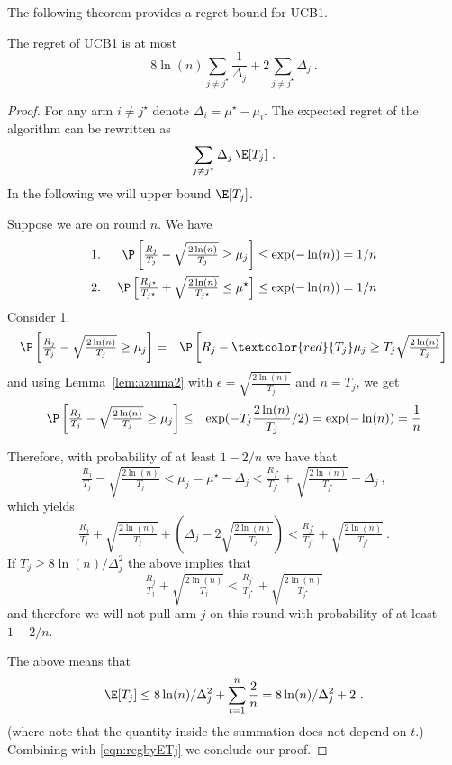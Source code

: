 The following theorem provides a regret bound for UCB1.
\begin{theorem}
The regret of UCB1 is at most
\[
8 \ln(n) \sum_{j \neq j^\star} \frac{1}{\Delta_j} + 2 \sum_{j \neq
  j^\star} \Delta_j ~.
\]
\end{theorem}
\begin{proof}
For any arm $i \neq j^\star$ denote $\Delta_i = \mu^\star -
\mu_i$. The expected regret of the algorithm can be rewritten as
\begin{equation} \label{eqn:regbyETj}
\sum_{j \neq j^\star} \Delta_j \, \E[T_j] ~.
\end{equation}
In the following we will upper bound $\E[T_j]$.

Suppose we are on round $n$. We have
\begin{eqnarray}
&1.&~\P\left[ \tfrac{R_j}{T_j} - \sqrt{\tfrac{2
         \ln(n)}{T_j}}  \ge \mu_j \right] \le
\exp( - \ln(n)) = 1/n\\
&2.&~\P\left[ \tfrac{R_{j^\star}}{T_{j^\star}}  + \sqrt{\tfrac{2
        \ln(n)}{T_{j^\star}}}  \le \mu^\star  \right] \le
\exp( -  \ln(n)) = 1/n
\end{eqnarray}
Consider 1.
\begin{eqnarray*}
\P\left[ \tfrac{R_j}{T_j} - \sqrt{\tfrac{2 \ln(n)}{T_j}}  \ge \mu_j \right] & = & \P\left[ R_j - \textcolor{red}{T_j} \mu_j \geq T_j \sqrt{\tfrac{2 \ln(n)}{T_j}}  \right]
\end{eqnarray*}
and using Lemma~\ref{lem:azuma2} with $\epsilon = \sqrt{\tfrac{2 \ln(n)}{T_j}}$ and $n = T_j$, we get
\begin{eqnarray*}
\P\left[ \tfrac{R_j}{T_j} - \sqrt{\tfrac{2 \ln(n)}{T_j}}  \ge \mu_j \right] & \leq & \exp (- T_j \frac{2 \ln(n)}{T_j} / 2) = \exp(-\ln(n)) = \frac{1}{n}
\end{eqnarray*}

Therefore, with probability of at least $1-2/n$ we have that
\[
\tfrac{R_j}{T_j} - \sqrt{\tfrac{2
         \ln(n)}{T_j}}  < \mu_j = \mu^\star - \Delta_j  <
\tfrac{R_{j^\star}}{T_{j^\star}}  + \sqrt{\tfrac{2
        \ln(n)}{T_{j^\star}}} - \Delta_j~,
\]
which yields
\[
\tfrac{R_j}{T_j} + \sqrt{\tfrac{2
         \ln(n)}{T_j}} + \left(\Delta_j - 2\sqrt{\tfrac{2
         \ln(n)}{T_j}} \right) < \tfrac{R_{j^\star}}{T_{j^\star}}  + \sqrt{\tfrac{2
        \ln(n)}{T_{j^\star}}}  ~.
\]
If $T_j \ge 8\ln(n)/\Delta_j^2$ the above implies that
\[
\tfrac{R_j}{T_j} + \sqrt{\tfrac{2
         \ln(n)}{T_j}} <
\tfrac{R_{j^\star}}{T_{j^\star}} + \sqrt{\tfrac{2
         \ln(n)}{T_{j^\star}}}
\]
and therefore we will not pull arm $j$ on this round with probability of at least
$1-2/n$.

The above means that
\[
\E[T_j] \le 8\ln(n)/\Delta_j^2 + \sum_{t=1}^{n} \frac{2}{n}
= 8\ln(n)/\Delta_j^2 + 2 ~.
\]
(where note that the quantity inside the summation does not depend on $t$.)
Combining with \eqref{eqn:regbyETj} we conclude our proof.
\end{proof}



